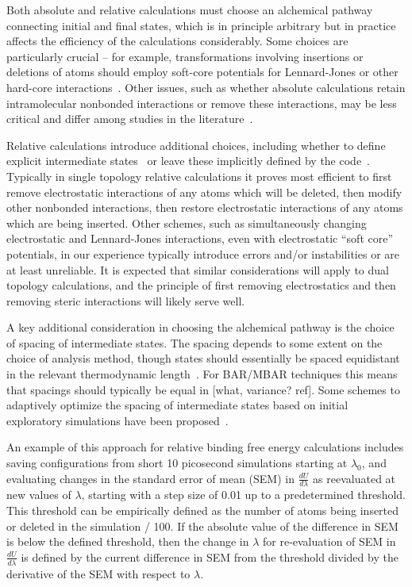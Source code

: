 \documentclass[9pt,bestpractices]{livecoms}
\begin{document}
Both absolute and relative calculations must choose an alchemical pathway connecting initial and final states, which is in principle arbitrary but in practice affects the efficiency of the calculations considerably.
Some choices are particularly crucial -- for example, transformations involving insertions or deletions of atoms should employ soft-core potentials for Lennard-Jones or other hard-core interactions~\cite{}.
Other issues, such as whether absolute calculations retain intramolecular nonbonded interactions or remove these interactions, may be less critical and differ among studies in the literature~\cite{}.

Relative calculations introduce additional choices, including whether to define explicit intermediate states~\cite{} or leave these implicitly defined by the code~\cite{}.
Typically in single topology relative calculations it proves most efficient to first remove electrostatic interactions of any atoms which will be deleted, then modify other nonbonded interactions, then restore electrostatic interactions of any atoms which are being inserted.
Other schemes, such as simultaneously changing electrostatic and Lennard-Jones interactions, even with electrostatic ``soft core'' potentials, in our experience typically introduce errors and/or instabilities or are at least unreliable.
It is expected that similar considerations will apply to dual topology calculations, and the principle of first removing electrostatics and then removing steric interactions will likely serve well.

A key additional consideration in choosing the alchemical pathway is the choice of spacing of intermediate states.
The spacing depends to some extent on the choice of analysis method, though states should essentially be spaced equidistant in the relevant thermodynamic length~\cite{}.
For BAR/MBAR techniques this means that spacings should typically be equal in [what, variance? ref].
Some schemes to adaptively optimize the spacing of intermediate states based on initial exploratory simulations have been proposed~\cite{}.

An example of this approach for relative binding free energy calculations includes saving configurations from short 10 picosecond simulations starting at $\lambda_0$, and evaluating changes in the standard error of mean (SEM) in $\frac{dU}{d\lambda}$ as reevaluated at new values of $\lambda$, starting with a step size of 0.01 up to a predetermined threshold.
This threshold can be empirically defined as the number of atoms being inserted or deleted in the simulation / 100.
If the absolute value of the difference in SEM is below the defined threshold, then the change in $\lambda$ for re-evaluation of SEM in $\frac{dU}{d\lambda}$ is defined by the current difference in SEM from the threshold divided by the derivative of the SEM with respect to $\lambda$.
\end{document}
